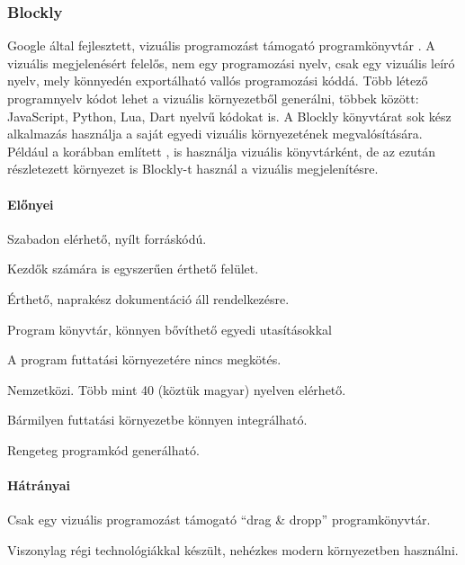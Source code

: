 \documentclass[12pt,a4paper,oneside]{report} %
\begin{document}
\subsubsection{Blockly}
\label{blocly}
Google által fejlesztett, vizuális programozást támogató programkönyvtár \cite{BlocklyUrl2020Feb} \cite{pasternak2017tips}. A vizuális megjelenésért felelős, nem egy programozási nyelv, csak egy vizuális leíró nyelv, mely könnyedén exportálható vallós programozási kóddá. Több létező programnyelv kódot lehet a vizuális környezetből generálni, többek között: JavaScript, Python, Lua, Dart nyelvű kódokat is. A Blockly könyvtárat sok kész alkalmazás használja a saját egyedi vizuális környezetének megvalósítására.
Például a korábban említett ,  is használja vizuális könyvtárként, de az ezután részletezett  környezet is Blockly-t használ a vizuális megjelenítésre.
\paragraph{Előnyei} 
\begin{compactitem}
	\item Szabadon elérhető, nyílt forráskódú.
	\item Kezdők számára is egyszerűen érthető felület.
	\item Érthető, naprakész dokumentáció áll rendelkezésre.
	\item Program könyvtár, könnyen bővíthető egyedi utasításokkal
	\item A program futtatási környezetére nincs megkötés.
	\item Nemzetközi. Több mint 40 (köztük magyar) nyelven elérhető.
	\item Bármilyen futtatási környezetbe könnyen integrálható.
	\item Rengeteg programkód generálható.
\end{compactitem}
\paragraph{Hátrányai} 
\begin{compactitem}
	\item Csak egy vizuális programozást támogató  ``drag \& dropp'' programkönyvtár.
	\item Viszonylag régi technológiákkal készült, nehézkes modern környezetben használni.
\end{compactitem}
\end{document}
